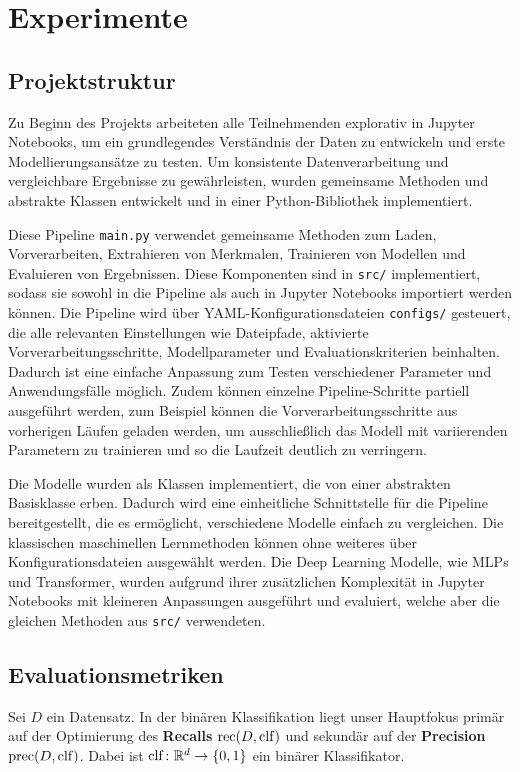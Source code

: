 \section{Experimente}

\subsection{Projektstruktur}
\label{sec:projektstruktur}
Zu Beginn des Projekts arbeiteten alle Teilnehmenden explorativ in Jupyter Notebooks, um ein grundlegendes Verständnis der Daten zu entwickeln und erste Modellierungsansätze zu testen. Um konsistente Datenverarbeitung und vergleichbare Ergebnisse zu gewährleisten, wurden gemeinsame Methoden und abstrakte Klassen entwickelt und in einer Python-Bibliothek implementiert.

Diese Pipeline \texttt{main.py} verwendet gemeinsame Methoden zum Laden, Vorverarbeiten, Extrahieren von Merkmalen, Trainieren von Modellen und Evaluieren von Ergebnissen. Diese Komponenten sind in \texttt{src/} implementiert, sodass sie sowohl in die Pipeline als auch in Jupyter Notebooks importiert werden können. Die Pipeline wird über YAML-Konfigurationsdateien \texttt{configs/} gesteuert, die alle relevanten Einstellungen wie Dateipfade, aktivierte Vorverarbeitungsschritte, Modellparameter und Evaluationskriterien beinhalten. Dadurch ist eine einfache Anpassung zum Testen verschiedener Parameter und Anwendungsfälle möglich. Zudem können einzelne Pipeline-Schritte partiell ausgeführt werden, zum Beispiel können die Vorverarbeitungsschritte aus vorherigen Läufen geladen werden, um ausschließlich das Modell mit variierenden Parametern zu trainieren und so die Laufzeit deutlich zu verringern.

Die Modelle wurden als Klassen implementiert, die von einer abstrakten Basisklasse erben. Dadurch wird eine einheitliche Schnittstelle für die Pipeline bereitgestellt, die es ermöglicht, verschiedene Modelle einfach zu vergleichen. Die klassischen maschinellen Lernmethoden können ohne weiteres über Konfigurationsdateien ausgewählt werden. Die Deep Learning Modelle, wie MLPs und Transformer, wurden aufgrund ihrer zusätzlichen Komplexität in Jupyter Notebooks mit kleineren Anpassungen ausgeführt und evaluiert, welche aber die gleichen Methoden aus \texttt{src/} verwendeten.

\subsection{Evaluationsmetriken}
Sei $D$ ein Datensatz. In der binären Klassifikation liegt unser Hauptfokus primär auf der Optimierung des \textbf{Recalls} $\operatorname{rec}(D, \operatorname{clf})$ und sekundär auf der \textbf{Precision} $\operatorname{prec}(D, \operatorname{clf})$. Dabei ist $\operatorname{clf}\colon\mathbb{R}^d\to \{0, 1\}$ ein binärer Klassifikator.\\

